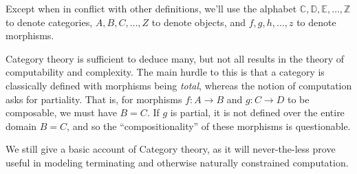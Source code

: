 \begin{notation} Except when in conflict with other definitions, we'll use the
alphabet $\mathbb{C},\mathbb{D},\mathbb{E},\ldots,\mathbb{Z}$ to denote
categories, $A,B,C,\ldots,Z$ to denote objects, and $f,g,h,\ldots,z$ to denote
morphisms.  \end{notation}


Category theory is sufficient to deduce many, but not all results in the theory
of computability and complexity\cite{di-paola-heller-1987}. The main hurdle to
this is that a category is classically defined with morphisms being
\emph{total}, whereas the notion of computation asks for partiality. That is,
for morphisms $f : A \rightarrow B$ and $g : C \rightarrow D$ to be composable,
we must have $B=C$. If $g$ is partial, it is not defined over the entire domain
$B=C$, and so the ``compositionality'' of these morphisms is questionable.

We still give a basic account of Category theory, as it will never-the-less
prove useful in modeling terminating and otherwise naturally constrained
computation.
